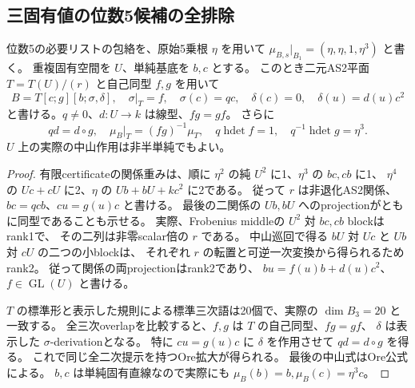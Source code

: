 \subsection{三固有値の位数5候補の全排除}
\label{subsec:cubic-fifth-root-spectrum}
\begin{lemma}[位数5の必要Ore表示]
\label{lem:cubic-fifth-root-Ore-form}
位数5の必要リストの包絡を、原始5乗根 $\eta$ を用いて
$\mu_{B,s}|_{B_1}=(\eta,\eta,1,\eta^3)$ と書く。
重複固有空間を $U$、単純基底を $b,c$ とする。
このとき二元AS2平面 $T=T(U)/(r)$ と自己同型 $f,g$ を用いて
\[
 B=T[c;g][b;\sigma,\delta],\quad
 \sigma|_T=f,\quad\sigma(c)=q c,\quad
 \delta(c)=0,\quad\delta(u)=d(u)c^2
\]
と書ける。$q\ne0$、$d:U\to k$ は線型、$fg=gf$。
さらに
\[
 qd=d\circ g,\quad
 \mu_B|_T=(fg)^{-1}\mu_T,\quad
 q\operatorname{hdet}f=1,\quad
 q^{-1}\operatorname{hdet}g=\eta^3.
\]
$U$ 上の実際の中山作用は非半単純でもよい。
\end{lemma}
\begin{proof}
有限certificateの関係重みは、順に
$\eta^2$ の純 $U^2$ に1、$\eta^3$ の $bc,cb$ に1、
$\eta^4$ の $Uc+cU$ に2、$\eta$ の $Ub+bU+kc^2$ に2である。
従って $r$ は非退化AS2関係、$bc=qcb$、$cu=g(u)c$ と書ける。
最後の二関係の $Ub,bU$ へのprojectionがともに同型であることも示せる。
実際、Frobenius middleの $U^2$ 対 $bc,cb$ blockはrank1で、
その二列は非零scalar倍の $r$ である。
中山巡回で得る $bU$ 対 $Uc$ と $Ub$ 対 $cU$ の二つの小blockは、
それぞれ $r$ の転置と可逆一次変換から得られるためrank2。
従って関係の両projectionはrank2であり、
$bu=f(u)b+d(u)c^2$、$f\in\operatorname{GL}(U)$ と書ける。

$T$ の標準形と表示した規則による標準三次語は20個で、実際の $\dim B_3=20$ と一致する。
全三次overlapを比較すると、$f,g$ は $T$ の自己同型、$fg=gf$、
$\delta$ は表示した $\sigma$-derivationとなる。
特に $cu=g(u)c$ に $\delta$ を作用させて $qd=d\circ g$ を得る。
これで同じ全二次提示を持つOre拡大が得られる。
最後の中山式はOre公式による。
$b,c$ は単純固有直線なので実際にも $\mu_B(b)=b,\mu_B(c)=\eta^3c$。
\end{proof}

